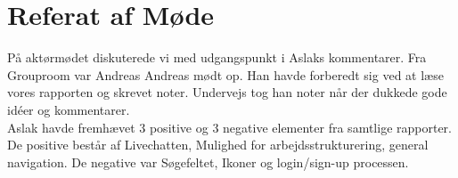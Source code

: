 \documentclass[12pt]{article}
\begin{document}

\clearpage\maketitle
\thispagestyle{empty}

\newpage

\thispagestyle{empty}

\newpage
\pagestyle{plain}
\setcounter{page}{1}
\section*{Referat af Møde}
\noindent På aktørmødet diskuterede vi med udgangspunkt i Aslaks kommentarer. Fra Grouproom var Andreas Andreas mødt op. Han havde forberedt sig ved at læse vores rapporten og skrevet noter. Undervejs tog han noter når der dukkede gode idéer og kommentarer. \\
Aslak havde fremhævet 3 positive og 3 negative elementer fra samtlige rapporter. 
De positive består af Livechatten, Mulighed for arbejdsstrukturering, general navigation. 
De negative var Søgefeltet, Ikoner og login/sign-up processen. \\
\end{document}
